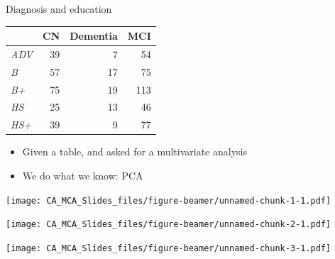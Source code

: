 \documentclass[
  ignorenonframetext,
]{beamer}
\providecommand{\tightlist}{%
  \setlength{\itemsep}{0pt}\setlength{\parskip}{0pt}}
\begin{document}
\begin{frame}{Diagnosis and education}
\protect\hypertarget{diagnosis-and-education}{}

\begin{table}[H]
\centering
\begin{tabular}{>{\em}lrrr}
\toprule
  & CN & Dementia & MCI\\
\midrule
ADV & 39 & 7 & 54\\
B & 57 & 17 & 75\\
B+ & 75 & 19 & 113\\
HS & 25 & 13 & 46\\
HS+ & 39 & 9 & 77\\
\bottomrule
\end{tabular}
\end{table}

\end{frame}

\begin{frame}

\begin{itemize}[<+->]
\tightlist
\item
  Given a table, and asked for a multivariate analysis
\item
  We do what we know: PCA
\end{itemize}

\end{frame}

\begin{frame}

\end{frame}

\begin{frame}

\texttt{[image: CA\_MCA\_Slides\_files/figure-beamer/unnamed-chunk-1-1.pdf]}

\end{frame}

\begin{frame}

\texttt{[image: CA\_MCA\_Slides\_files/figure-beamer/unnamed-chunk-2-1.pdf]}

\end{frame}

\begin{frame}

\texttt{[image: CA\_MCA\_Slides\_files/figure-beamer/unnamed-chunk-3-1.pdf]}

\end{frame}
\end{document}
